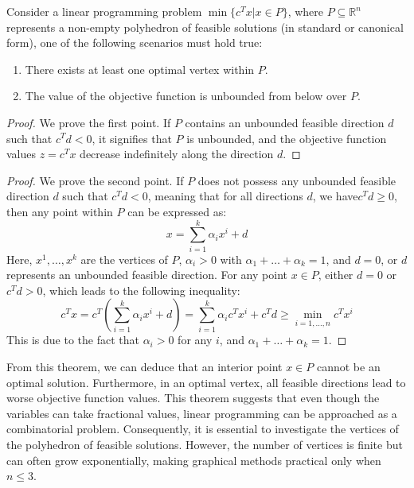 \begin{theorem}
    Consider a linear programming problem $\min\{c^Tx|x \in P\}$, where $P \subseteq \mathbb{R}^n$ represents a non-empty polyhedron of feasible solutions (in standard or canonical form), one of the following scenarios must hold true:
    \begin{enumerate}
        \item There exists at least one optimal vertex within $P$.
        \item The value of the objective function is unbounded from below over $P$.
    \end{enumerate}
\end{theorem}
\begin{proof}
    We prove the first point. 
    If $P$ contains an unbounded feasible direction $d$ such that $c^Td < 0$, it signifies that $P$ is unbounded, and the objective function values $z=c^Tx$ decrease indefinitely along the direction $d$. 
\end{proof}
\begin{proof}
    We prove the second point. 
    If $P$ does not possess any unbounded feasible direction $d$ such that $c^Td < 0$, meaning that for all directions $d$, we have$c^Td \geq 0$, then any point within $P$ can be expressed as: 
    \[x=\sum_{i=1}^k{\alpha_ix^i + d}\]
    Here, $x^1,\dots,x^k$ are the vertices of $P$, $\alpha_i > 0$ with $\alpha_1+\dots+\alpha_k=1$, and $d = 0$, or $d$ represents an unbounded feasible direction.
    For any point $x \in P$, either $d = 0$ or $c^Td > 0$, which leads to the following inequality:
    \[c^Tx=c^T\left(\sum_{i=1}^{k}{\alpha_ix^i+d}\right)=\sum_{i=1}^{k}{\alpha_ic^Tx^i+c^Td}\geq\min_{i=1,\dots,n}{c^Tx^i}\]
    This is due to the fact that $\alpha_i > 0$ for any $i$, and $\alpha_1+\dots+\alpha_k=1$. 
\end{proof}
From this theorem, we can deduce that an interior point $x \in P$ cannot be an optimal solution. 
Furthermore, in an optimal vertex, all feasible directions lead to worse objective function values.
This theorem suggests that even though the variables can take fractional values, linear programming can be approached as a combinatorial problem.
Consequently, it is essential to investigate the vertices of the polyhedron of feasible solutions.
However, the number of vertices is finite but can often grow exponentially, making graphical methods practical only when $n \leq 3$. 
